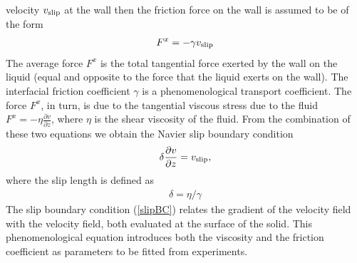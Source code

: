 \documentclass[b5paper,openright,10pt]{book}
\begin{document}
velocity $  v_{\rm slip}$ at the  wall then the friction  force on the
wall is assumed to be of the form
\begin{align}
  F^x=-\gamma v_{\rm slip}
\end{align}
The average force  $F^x$ is the total tangential force  exerted by the
wall on  the liquid (equal and  opposite to the force  that the liquid
exerts   on  the   wall).    The   interfacial  friction   coefficient
$\gamma$ is a phenomenological transport coefficient.  The
force $F^x$, in  turn, is due to the tangential  viscous stress due to
the fluid  $F^x=-\eta \frac{\partial  v}{\partial z}$, where  $\eta$ is
the shear  viscosity of the fluid.  From the combination of  these two
equations we obtain the Navier slip boundary condition
\begin{align}
  \delta  \frac{\partial v}{\partial z}=v_{\rm slip},
\label{slipBC}
\end{align}
where the slip length  is defined as
\begin{align}
  \delta=\eta/\gamma
\end{align}
The slip boundary condition (\ref{slipBC}) relates the gradient of the
velocity field with the velocity  field, both evaluated at the surface
of  the solid.   This  phenomenological equation  introduces both  the
viscosity and the friction coefficient as parameters to be fitted from
experiments. 
\end{document}

